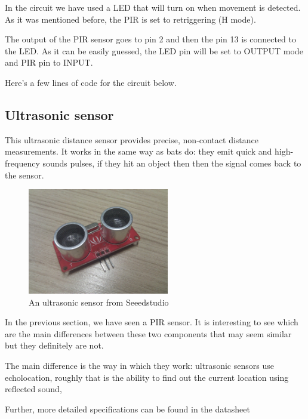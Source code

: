 In the circuit we have used a LED that will turn on when movement is detected. As it was mentioned before, the PIR is set to retriggering (H mode).

The output of the PIR sensor goes to pin 2 and then the pin 13 is connected to the LED. As it can be easily guessed, the LED pin will be set to OUTPUT mode and PIR pin to INPUT.

Here's a few lines of code for the circuit below.



\subsection{Ultrasonic sensor}
This ultrasonic distance sensor provides precise, non-contact distance measurements. It works in the same way as bats do: they emit quick and high-frequency sounds pulses, if they hit an object then then the signal comes back to the sensor.

\begin{figure}[H]
    \centering
    \includegraphics[width=0.55\textwidth]{fig/ultrasonic.jpg}
    \caption{An ultrasonic sensor from Seeedstudio}
    \label{fig:ultrasonic}
\end{figure}

In the previous section, we have seen a PIR sensor. It is interesting to see which are the main differences between these two components that may seem similar but they definitely are not.

	The main difference is the way in which they work: ultrasonic sensors use echolocation\cite{echolocation}, roughly that is the ability to find out the current location using reflected sound, 

Further, more detailed specifications can be found in the datasheet\cite{ultrasonic-datasheet}
		
